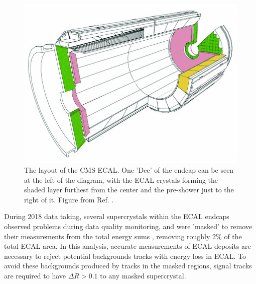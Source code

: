 \begin{figure}[htbp]
    \includegraphics[width=\textwidth]{figures/ecal_layout.jpg}
    \centering
	\caption[The CMS Electromagnetic Calorimeter]{The layout of the CMS ECAL. One 'Dee' of the endcap can be seen at the left of the diagram, with the ECAL crystals forming the shaded layer furthest from the center and the pre-shower just to the right of it. Figure from Ref. \cite{cooke2022}.}
    \label{fig:ecalLayout}
\end{figure}

During 2018 data taking, several supercrystals within the ECAL endcaps observed problems during data quality monitoring, and were 'masked' to remove their measurements from the total energy sums , removing roughly 2$\%$ of the total ECAL area.
In this analysis, accurate measurements of ECAL deposits are necessary to reject potential backgrounds tracks with energy loss in ECAL.
To avoid these backgrounds produced by tracks in the masked regions, signal tracks are required to have $\Delta R>0.1$ to any masked supercrystal.

